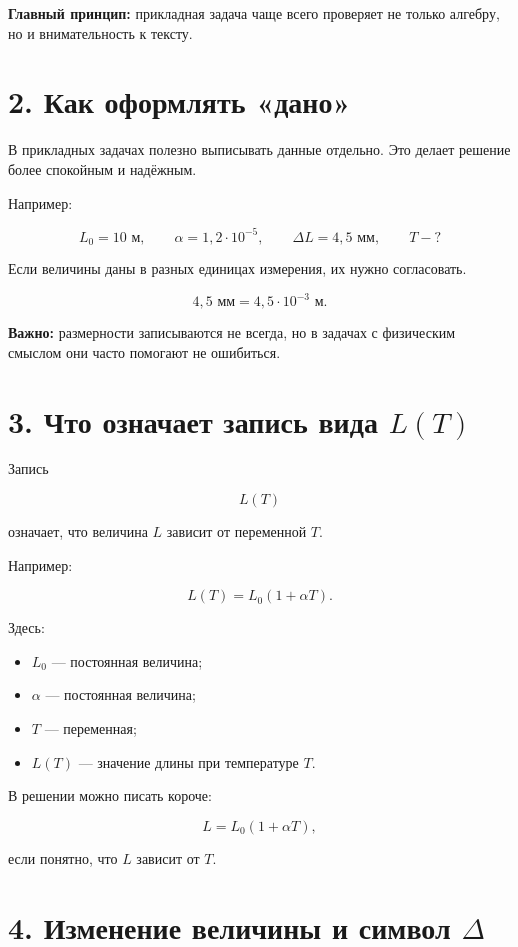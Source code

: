 \documentclass[a4paper,12pt]{article}
\begin{document}
\textbf{Главный принцип:} прикладная задача чаще всего проверяет не только алгебру, но и внимательность к тексту.

\section*{2. Как оформлять «дано»}

В прикладных задачах полезно выписывать данные отдельно. Это делает решение более спокойным и надёжным.

Например:

\[
L_0=10\text{ м},
\qquad
\alpha=1{,}2\cdot10^{-5},
\qquad
\Delta L=4{,}5\text{ мм},
\qquad
T-?
\]

Если величины даны в разных единицах измерения, их нужно согласовать.

\[
4{,}5\text{ мм}=4{,}5\cdot10^{-3}\text{ м}.
\]

\textbf{Важно:} размерности записываются не всегда, но в задачах с физическим смыслом они часто помогают не ошибиться.

\section*{3. Что означает запись вида \(L(T)\)}

Запись

\[
L(T)
\]

означает, что величина \(L\) зависит от переменной \(T\).

Например:

\[
L(T)=L_0(1+\alpha T).
\]

Здесь:

\begin{itemize}
  \item \(L_0\) — постоянная величина;
  \item \(\alpha\) — постоянная величина;
  \item \(T\) — переменная;
  \item \(L(T)\) — значение длины при температуре \(T\).
\end{itemize}

В решении можно писать короче:

\[
L=L_0(1+\alpha T),
\]

если понятно, что \(L\) зависит от \(T\).

\section*{4. Изменение величины и символ \(\Delta\)}
\end{document}
